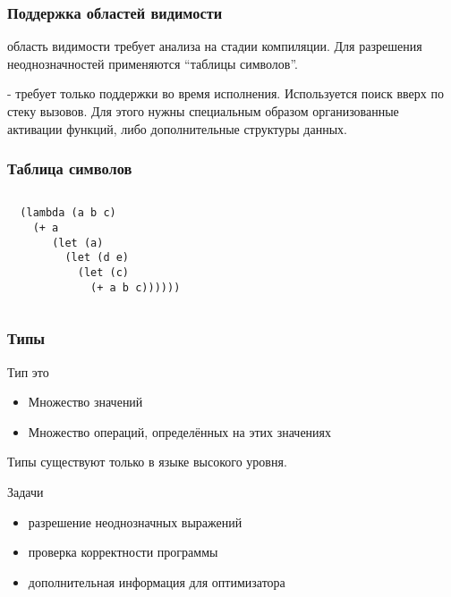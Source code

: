 \documentclass[16pt,pdf,unicode]{beamer}
\begin{document}
\begin{frame}
  \frametitle{Поддержка областей видимости}
\begin{block}{}
  {} область видимости требует анализа на стадии компиляции. Для разрешения неоднозначностей применяются ``таблицы символов''.
\end{block}
\begin{exampleblock}{}
  {} - требует только поддержки во время исполнения. Используется поиск вверх по стеку вызовов. Для этого нужны специальным образом организованные активации функций, либо дополнительные структуры данных.
\end{exampleblock}
\end{frame}

\begin{frame}[fragile]
  \frametitle{Таблица символов}
\begin{columns}
\begin{lstlisting}
  (lambda (a b c)
    (+ a
       (let (a)
         (let (d e)
           (let (c)
             (+ a b c))))))
\end{lstlisting}
\end{columns}
\end{frame}

\begin{frame}
  \frametitle{Типы}
\begin{exampleblock}{Тип это}
  \begin{itemize}
    \item Множество значений
    \item Множество операций, определённых на этих значениях
  \end{itemize}
\end{exampleblock}
\begin{block}{}
  Типы существуют только в языке высокого уровня.
\end{block}
\begin{block}{Задачи}
  \begin{itemize}
    \item разрешение неоднозначных выражений
    \item проверка корректности программы
    \item дополнительная информация для оптимизатора
  \end{itemize}
\end{block}
\end{frame}
\end{document}
